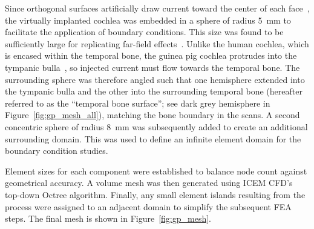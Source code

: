 Since orthogonal surfaces artificially draw current toward the center of each
face~\cite{wong2013ciap}, the virtually implanted cochlea was embedded in a
sphere of radius 5~mm to facilitate the application of boundary conditions. This
size was found to be sufficiently large for replicating far-field
effects~\cite{wong2013ciap}. Unlike the human cochlea, which is encased within
the temporal bone, the guinea pig cochlea protrudes into the tympanic
bulla~\cite{cooper1975}, so injected current must flow towards the temporal
bone. The surrounding sphere was therefore angled such that one hemisphere
extended into the tympanic bulla and the other into the surrounding temporal
bone (hereafter referred to as the ``temporal bone surface''; see dark grey
hemisphere in Figure~\ref{fig:gp_mesh_all}), matching the bone boundary in the
scans. A second concentric sphere of radius 8~mm was subsequently added to
create an additional surrounding domain. This was used to define an infinite
element domain for the boundary condition studies.

Element sizes for each component were established to balance node count against
geometrical accuracy. A volume mesh was then generated using ICEM CFD's top-down
Octree algorithm. Finally, any small element islands resulting from the process
were assigned to an adjacent domain to simplify the subsequent FEA steps. The
final mesh is shown in Figure~\ref{fig:gp_mesh}.

